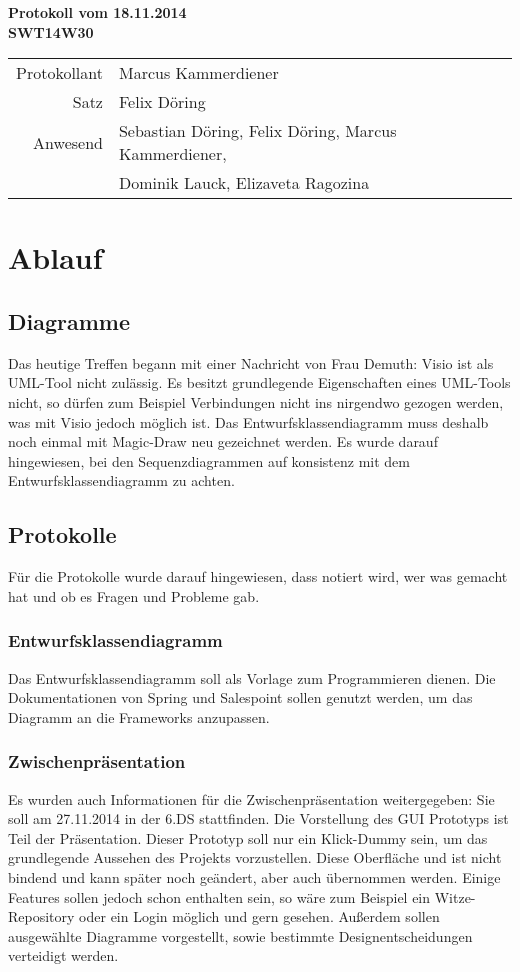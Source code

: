 \documentclass{scrartcl}
\begin{document}
\begin{center}
\LARGE \bf{Protokoll vom 18.11.2014 \\
SWT14W30}
\end{center}

\begin{tabular}{rp{10cm}}
Protokollant & Marcus Kammerdiener \\
Satz & Felix Döring \\
Anwesend & Sebastian Döring, Felix Döring, Marcus Kammerdiener,\\
& Dominik Lauck, Elizaveta Ragozina \\
\end{tabular}

\vspace*{3em}

\section{Ablauf}
\subsection{Diagramme}
Das heutige Treffen begann mit einer Nachricht von Frau Demuth: Visio ist als UML-Tool nicht zulässig. Es besitzt grundlegende Eigenschaften eines UML-Tools nicht, so dürfen zum Beispiel Verbindungen nicht ins nirgendwo gezogen werden, was mit Visio jedoch möglich ist. Das Entwurfsklassendiagramm muss deshalb noch einmal mit Magic-Draw neu gezeichnet werden. Es wurde darauf hingewiesen, bei den Sequenzdiagrammen auf konsistenz mit dem Entwurfsklassendiagramm zu achten.
\subsection{Protokolle}
Für die Protokolle wurde darauf hingewiesen, dass notiert wird, wer was gemacht hat und ob es Fragen und Probleme gab.\subsubsection{Entwurfsklassendiagramm}
Das Entwurfsklassendiagramm soll als Vorlage zum Programmieren dienen. Die Dokumentationen von Spring und Salespoint sollen genutzt werden, um das Diagramm an die Frameworks anzupassen.
\subsubsection{Zwischenpräsentation}
Es wurden auch Informationen für die Zwischenpräsentation weitergegeben: Sie soll am 27.11.2014 in der 6.DS stattfinden. Die Vorstellung des GUI Prototyps ist Teil der Präsentation. Dieser Prototyp soll nur ein Klick-Dummy sein, um das grundlegende Aussehen des Projekts vorzustellen. Diese Oberfläche und ist nicht bindend und kann später noch geändert, aber auch übernommen werden. Einige Features sollen jedoch schon enthalten sein, so wäre zum Beispiel ein Witze- Repository oder ein Login möglich und gern gesehen. Außerdem sollen ausgewählte Diagramme vorgestellt, sowie bestimmte Designentscheidungen verteidigt werden.
\end{document}
